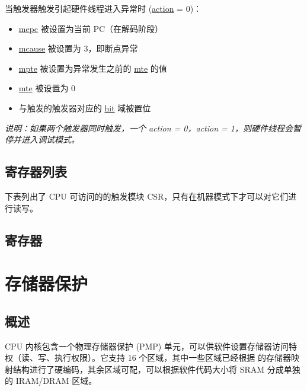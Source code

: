 \documentclass[main\_\_CN.tex]{subfiles}
\begin{document}
当触发器触发引起硬件线程进入异常时 (\hyperref[fielddesc:MCONTROLACTION]{action} = 0)：
\begin{itemize}
    \item \hyperref[regdesc:MEPC]{mepc} 被设置为当前 PC（在解码阶段）
    \item \hyperref[regdesc:MCAUSE]{mcause} 被设置为 3，即断点异常
    \item \hyperref[fielddesc:TCONTROLMPTE]{mpte} 被设置为异常发生之前的 \hyperref[fielddesc:TCONTROLMTE]{mte} 的值
    \item \hyperref[fielddesc:TCONTROLMTE]{mte} 被设置为 0
    \item 与触发的触发器对应的 \hyperref[fielddesc:MCONTROLHIT]{hit} 域被置位
\end{itemize}

\textit{说明：如果两个触发器同时触发，一个 action = 0，action = 1，则硬件线程会暂停并进入调试模式。}


\hypertarget{riscvcpu-hwt-reg-summ}{}
\subsection{寄存器列表}
\label{sec:riscvcpu-hwt-reg-summ}


下表列出了 CPU 可访问的的触发模块 CSR，只有在机器模式下才可以对它们进行读写。




\subsection{寄存器}




\clearpage
\section{存储器保护}
\label{sec:riscvcpu-pmp}

\subsection{概述}
\label{sec:riscvcpu-pmp-overview}
CPU 内核包含一个物理存储器保护 (PMP) 单元，可以供软件设置存储器访问特权（读、写、执行权限）。它支持 16 个区域，其中一些区域已经根据 \chipname{} 的存储器映射结构进行了硬编码，其余区域可配，可以根据软件代码大小将 SRAM 分成单独的 IRAM/DRAM 区域。
\end{document}

